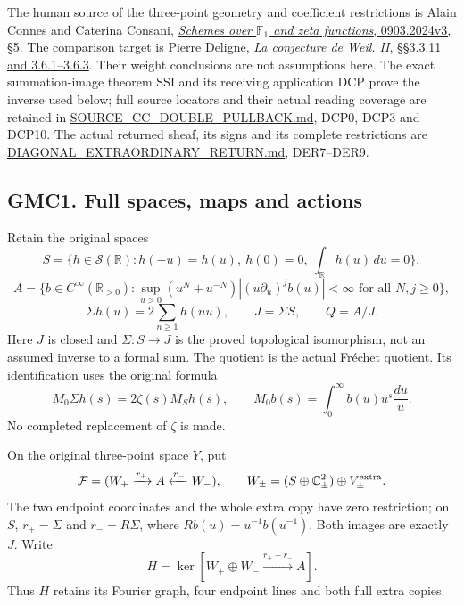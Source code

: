 The human source of the three-point geometry and coefficient
restrictions is Alain Connes and Caterina Consani,
\href{https://arxiv.org/abs/0903.2024v3}{\emph{Schemes over
\(\mathbb F_1\) and zeta functions}, 0903.2024v3, §5}. The comparison
target is Pierre Deligne,
\href{https://www.numdam.org/item/PMIHES_1980__52__137_0/}{\emph{La
conjecture de Weil. II}, §§3.3.11 and 3.6.1--3.6.3}. Their weight
conclusions are not assumptions here. The exact summation-image theorem
SSI and its receiving application DCP prove the inverse used below; full
source locators and their actual reading coverage are retained in
\href{https://github.com/KokunoYumeto/zeta-function-research-reader/blob/36a82ecca98addb8a98b48204e349737856c7223/workbenches/splitzero-tandem/continuations/20260924-cohomology-weight-and-character-lifts/original-character-lifting/tau_lifting_weights_20260924/SOURCE_CC_DOUBLE_PULLBACK.md}{SOURCE\_CC\_DOUBLE\_PULLBACK.md},
DCP0, DCP3 and DCP10. The actual returned sheaf, its signs and its
complete restrictions are
\href{https://github.com/KokunoYumeto/zeta-function-research-reader/blob/main/workbenches/splitzero-tandem/continuations/20260925-full-source-tensor-and-original-divisor/counterfactual/DIAGONAL_EXTRAORDINARY_RETURN.md}{DIAGONAL\_EXTRAORDINARY\_RETURN.md},
DER7--DER9.

\subsection{GMC1. Full spaces, maps and
actions}\label{gmc1.-full-spaces-maps-and-actions}

Retain the original spaces \[
S=\{h\in\mathcal S(\mathbb R):h(-u)=h(u),\ h(0)=0,\ \int_{\mathbb R}h(u)\,du=0\},
\] \[
A=\{b\in C^\infty(\mathbb R_{>0}):
\sup_{u>0}(u^N+u^{-N})|(u\partial_u)^j b(u)|<\infty
\text{ for all }N,j\geq0\},
\] \[
\Sigma h(u)=2\sum_{n\geq1}h(nu),\qquad
J=\Sigma S,\qquad Q=A/J.
\tag{GMC1.1}
\] Here \(J\) is closed and \(\Sigma:S\to J\) is the proved topological
isomorphism, not an assumed inverse to a formal sum. The quotient is the
actual Fréchet quotient. Its identification uses the original formula \[
M_0\Sigma h(s)=2\zeta(s)M_Sh(s),\qquad
M_0b(s)=\int_0^\infty b(u)u^s\frac{du}{u}.
\tag{GMC1.2}
\] No completed replacement of \(\zeta\) is made.

On the original three-point space \(Y\), put \[
\mathcal F=(W_+\xrightarrow{r_+}A\xleftarrow{r_-}W_-),\qquad
W_\pm=(S\oplus\mathbb C^2_\pm)\oplus V_\pm^{\rm extra}.
\] The two endpoint coordinates and the whole extra copy have zero
restriction; on \(S\), \(r_+=\Sigma\) and \(r_-=R\Sigma\), where
\(Rb(u)=u^{-1}b(u^{-1})\). Both images are exactly \(J\). Write \[
H=\ker[W_+\oplus W_-\xrightarrow{r_+-r_-}A].
\tag{GMC1.3}
\] Thus \(H\) retains its Fourier graph, four endpoint lines and both
full extra copies.

